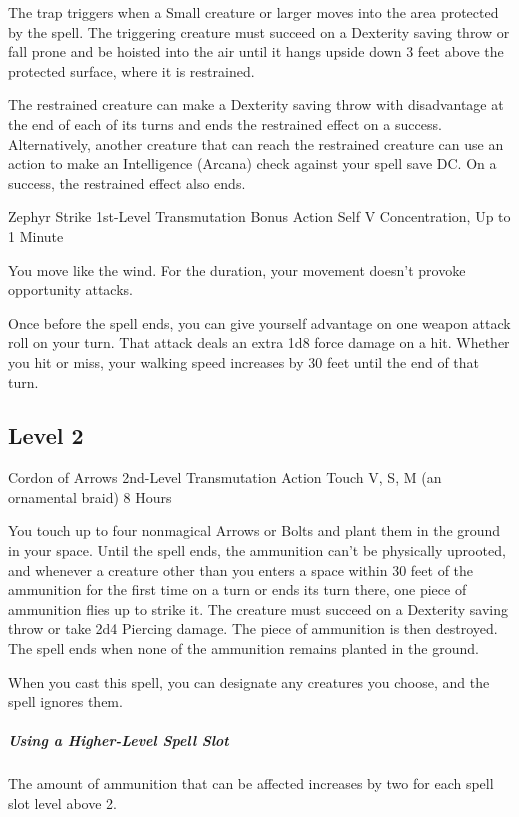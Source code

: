 \documentclass[letterpaper,openany,oneside,twocolumn]{book}
\begin{document}
The trap triggers when a Small creature or larger moves into the area protected by the spell. The triggering creature must succeed on a Dexterity saving throw or fall prone and be hoisted into the air until it hangs upside down 3 feet above the protected surface, where it is restrained.

The restrained creature can make a Dexterity saving throw with disadvantage at the end of each of its turns and ends the restrained effect on a success. Alternatively, another creature that can reach the restrained creature can use an action to make an Intelligence (Arcana) check against your spell save DC. On a success, the restrained effect also ends.

\DndSpellHeader
  {Zephyr Strike}
  {1st-Level Transmutation}
  {Bonus Action}
  {Self}
  {V}
  {Concentration, Up to 1 Minute}

You move like the wind. For the duration, your movement doesn't provoke opportunity attacks.

Once before the spell ends, you can give yourself advantage on one weapon attack roll on your turn. That attack deals an extra 1d8 force damage on a hit. Whether you hit or miss, your walking speed increases by 30 feet until the end of that turn.

\subsection*{Level 2}

\DndSpellHeader
  {Cordon of Arrows}
  {2nd-Level Transmutation}
  {Action}
  {Touch}
  {V, S, M (an ornamental braid)}
  {8 Hours}

You touch up to four nonmagical Arrows or Bolts and plant them in the ground in your space. Until the spell ends, the ammunition can't be physically uprooted, and whenever a creature other than you enters a space within 30 feet of the ammunition for the first time on a turn or ends its turn there, one piece of ammunition flies up to strike it. The creature must succeed on a Dexterity saving throw or take 2d4 Piercing damage. The piece of ammunition is then destroyed. The spell ends when none of the ammunition remains planted in the ground.

When you cast this spell, you can designate any creatures you choose, and the spell ignores them.

\subparagraph*{Using a Higher-Level Spell Slot} The amount of ammunition that can be affected increases by two for each spell slot level above 2.
\end{document}
